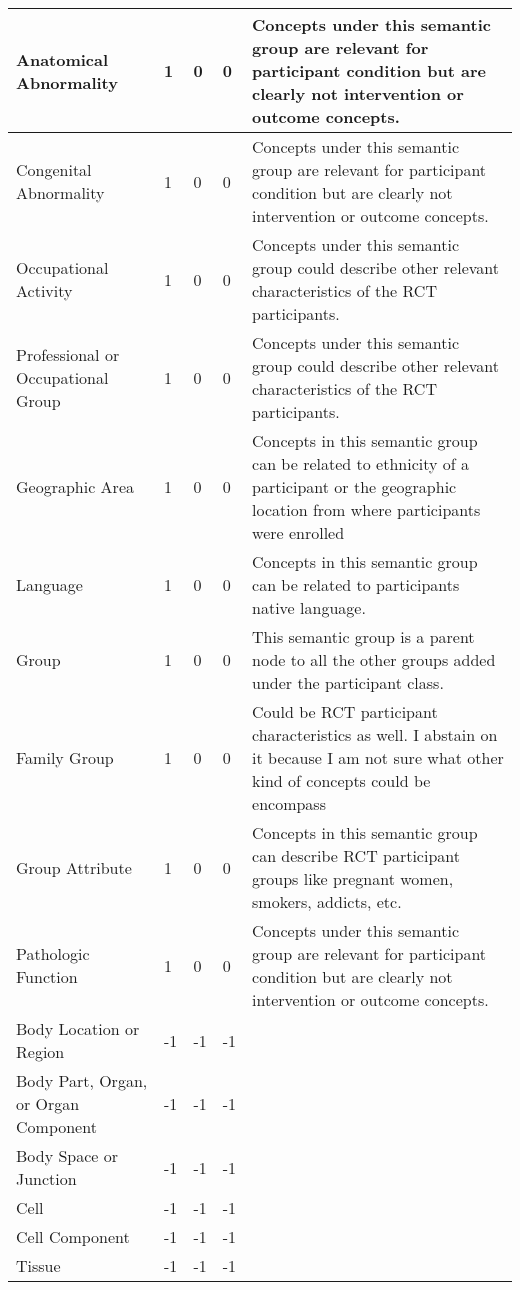 \documentclass[10.7pt,]{article}
\begin{document}
\begin{longtable}{|l|p{0.3cm}|p{0.3cm}|p{0.3cm}|p{7.9cm}|}
        Anatomical Abnormality & 1 & 0 & 0 & Concepts under this semantic group are relevant for participant condition but are clearly not intervention or outcome concepts. \\ \hline
        Congenital Abnormality & 1 & 0 & 0 & Concepts under this semantic group are relevant for participant condition but are clearly not intervention or outcome concepts. \\ \hline
        Occupational Activity & 1 & 0 & 0 & Concepts under this semantic group could describe other relevant characteristics of the RCT participants. \\ \hline
        Professional or Occupational Group & 1 & 0 & 0 & Concepts under this semantic group could describe other relevant characteristics of the RCT participants. \\ \hline
        Geographic Area & 1 & 0 & 0 & Concepts in this semantic group can be related to ethnicity of a participant or the geographic location from where participants were enrolled \\ \hline
        Language & 1 & 0 & 0 & Concepts in this semantic group can be related to participants native language. \\ \hline
        Group & 1 & 0 & 0 & This semantic group is a parent node to all the other groups added under the participant class. \\ \hline
        Family Group & 1 & 0 & 0 & Could be RCT participant characteristics as well. I abstain on it because I am not sure what other kind of concepts could be encompass \\ \hline
        Group Attribute & 1 & 0 & 0 & Concepts in this semantic group can describe RCT participant groups like pregnant women, smokers, addicts, etc. \\ \hline
        Pathologic Function & 1 & 0 & 0 & Concepts under this semantic group are relevant for participant condition but are clearly not intervention or outcome concepts. \\ \hline
        Body Location or Region & -1 & -1 & -1 & ~ \\ \hline
        Body Part, Organ, or Organ Component & -1 & -1 & -1 & ~ \\ \hline
        Body Space or Junction & -1 & -1 & -1 & ~ \\ \hline
        Cell & -1 & -1 & -1 & ~ \\ \hline
        Cell Component & -1 & -1 & -1 & ~ \\ \hline
        Tissue & -1 & -1 & -1 & ~ \\ \hline

\end{longtable}
\end{document}

